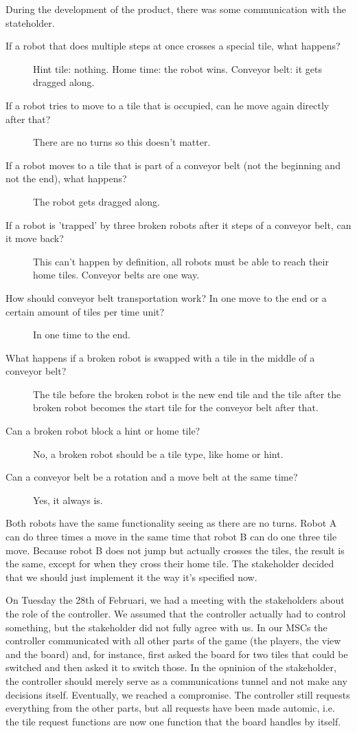 During the development of the product, there was some communication with the stateholder.

\begin{description}
	\item[If a robot that does multiple steps at once crosses a special tile, what happens?] Hint tile: nothing. Home time: the robot wins. Conveyor belt: it gets dragged along.
	\item[If a robot tries to move to a tile that is occupied, can he move again directly after that?] There are no turns so this doesn't matter.
	\item[If a robot moves to a tile that is part of a conveyor belt (not the beginning and not the end), what happens?] The robot gets dragged along.
	\item[If a robot is 'trapped' by three broken robots after it steps of a conveyor belt, can it move back?] This can't happen by definition, all robots must be able to reach their home tiles. Conveyor belts are one way.
	\item[How should conveyor belt transportation work? In one move to the end or a certain amount of tiles per time unit?] In one time to the end.
	\item[What happens if a broken robot is swapped with a tile in the middle of a conveyor belt?] The tile before the broken robot is the new end tile and the tile after the broken robot becomes the start tile for the conveyor belt after that.
	\item[Can a broken robot block a hint or home tile?] No, a broken robot should be a tile type, like home or hint.
	\item[Can a conveyor belt be a rotation and a move belt at the same time?] Yes, it always is.
\end{description}

Both robots have the same functionality seeing as there are no turns. Robot A can do three times a move in the same time that robot B can do one three tile move. Because robot B does not jump but actually crosses the tiles, the result is the same, except for when they cross their home tile. The stakeholder decided that we should just implement it the way it's specified now.

On Tuesday the 28th of Februari, we had a meeting with the stakeholders about the role of the controller. We assumed that the controller actually had to control something, but the stakeholder did not fully agree with us. In our MSCs the controller communicated with all other parts of the game (the players, the view and the board) and, for instance, first asked the board for two tiles that could be switched and then asked it to switch those. In the opninion of the stakeholder, the controller should merely serve as a communications tunnel and not make any decisions itself. Eventually, we reached a compromise. The controller still requests everything from the other parts, but all requests have been made automic, i.e. the tile request functions are now one function that the board handles by itself.
